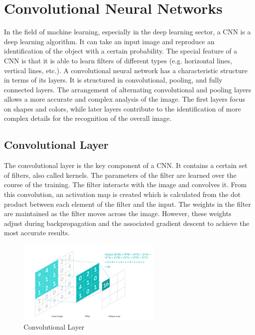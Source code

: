 \section{Convolutional Neural Networks}


In the field of machine learning, especially in the deep learning sector, a CNN is a deep learning algorithm. It can take an input image and reproduce an identification of the object with a certain probability. The special feature of a CNN is that it is able to learn filters of different types (e.g. horizontal lines, vertical lines, etc.). A convolutional neural network has a characteristic structure in terms of its layers. It is structured in convolutional, pooling, and fully connected layers. The arrangement of alternating convolutional and pooling layers allows a more accurate and complex analysis of the image. The first layers focus on shapes and colors, while later layers contribute to the identification of more complex details for the recognition of the overall image.

\subsection{Convolutional Layer}
The convolutional layer is the key component of a CNN. It contains a certain set of filters, also called kernels. The parameters of the filter are learned over the course of the training. The filter interacts with the image and convolves it. From this convolution, an activation map is created which is calculated from the dot product between each element of the filter and the input. The weights in the filter are maintained as the filter moves across the image. However, these weights adjust during backpropagation and the associated gradient descent to achieve the most accurate results. 

\begin{figure}[htb]
    \centering
    \includegraphics[width=7cm]{images/conv_layer.jpg}
    \caption{Convolutional Layer}
    \label{fig:convLayer}
\end{figure}

